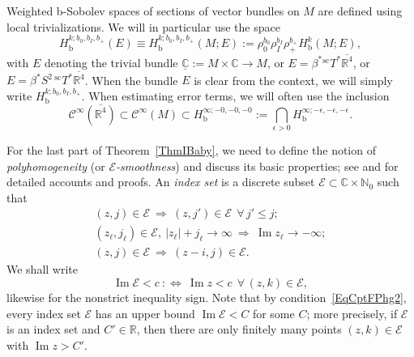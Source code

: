 \documentclass[reqno,11pt,letterpaper]{amsart}
\numberwithin{equation}{section}
\numberwithin{figure}{section}
\theoremstyle{definition}
\theoremstyle{remark}
\newcommand{\mc}{\mathcal}
\newcommand{\cC}{\mc C}
\newcommand{\cE}{\mc E}
\newcommand{\C}{\mathbb{C}}
\newcommand{\N}{\mathbb{N}}
\newcommand{\R}{\mathbb{R}}
\renewcommand{\Im}{\operatorname{Im}}
\newcommand{\eps}{\epsilon}
\newcommand{\Lra}{\Longrightarrow}
\newcommand{\ol}{\overline}
\newcommand{\ul}[1]{\underline{#1}{}}
\newcommand{\bop}{{\mathrm{b}}}
\newcommand{\scl}{{\mathrm{sc}}}
\newcommand{\Tsc}{{}^{\scl}T}
\newcommand{\CI}{\cC^\infty}
\newcommand{\Hb}{H_{\bop}}
\begin{document}
Weighted b-Sobolev spaces of sections of vector bundles on $M$ are defined using local trivializations. We will in particular use the space
\begin{equation}
\label{EqCptFX}
  \Hb^{k;b_0,b_I,b_+}(E)\equiv\Hb^{k;b_0,b_I,b_+}(M;E) := \rho_0^{b_0}\rho_I^{b_I}\rho_+^{b_+}\Hb^k(M;E),
\end{equation}
with $E$ denoting the trivial bundle $\ul\C:=M\times\C\to M$, or $E=\beta^*\Tsc^*\ol{\R^4}$, or $E=\beta^*S^2\,\Tsc^*\ol{\R^4}$. When the bundle $E$ is clear from the context, we will simply write $\Hb^{k;b_0,b_I,b_+}$. When estimating error terms, we will often use the inclusion
\[
  \CI(\ol{\R^4}) \subset \CI(M) \subset \Hb^{\infty;-0,-0,-0} := \bigcap_{\eps>0}\Hb^{\infty;-\eps,-\eps,-\eps}.
\]


For the last part of Theorem~\ref{ThmIBaby}, we need to define the notion of \emph{polyhomogeneity} (or \emph{$\cE$-smoothness}) and discuss its basic properties; see \cite[\S2A]{MazzeoEdge} and \cite[\S4.15]{MelroseDiffOnMwc} for detailed accounts and proofs. An \emph{index set} is a discrete subset $\cE\subset\C\times\N_0$ such that
\begin{subequations}
\begin{gather}
\label{EqCptFPhg1}
  (z,j)\in\cE\ \Lra\ (z,j')\in\cE\ \ \forall\,j'\leq j; \\
\label{EqCptFPhg2}
  (z_\ell,j_\ell)\in\cE,\ |z_\ell|+j_\ell\to\infty\ \Lra\ \Im z_\ell\to-\infty; \\
\label{EqCptFPhg3}
  (z,j)\in\cE\ \Lra\ (z-i,j)\in\cE.
\end{gather}
\end{subequations}
We shall write
\begin{equation}
\label{EqCptFPhgBound}
  \Im\cE < c\ :\Longleftrightarrow\ \Im z<c\ \ \forall\,(z,k)\in\cE,
\end{equation}
likewise for the nonstrict inequality sign. Note that by condition~\eqref{EqCptFPhg2}, every index set $\cE$ has an upper bound $\Im\cE<C$ for some $C$; more precisely, if $\cE$ is an index set and $C'\in\R$, then there are only finitely many points $(z,k)\in\cE$ with $\Im z>C'$.
\end{document}
